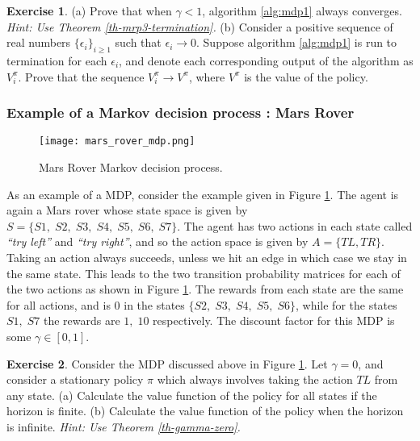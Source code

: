 \documentclass{article}
\theoremstyle{definition}
\newtheorem{exercise}{Exercise}[section]
\theoremstyle{remark}
\begin{document}
\begin{exercise}
(a) Prove that when $\gamma < 1$, algorithm \ref{alg:mdp1} always converges. \textit{Hint: Use Theorem \ref{th-mrp3-termination}.} (b) Consider a positive sequence of real numbers $\{\epsilon_i\}_{i \geq 1}$ such that $\epsilon_i \rightarrow 0$. Suppose algorithm \ref{alg:mdp1} is run to termination for each $\epsilon_i$, and denote each corresponding output of the algorithm as $V^{\pi}_{i}$. Prove that the sequence $V^{\pi}_{i} \rightarrow V^{\pi}$, where $V^{\pi}$ is the value of the policy.
\label{ex-mdp-valuefunc-alg-iterative-proof}
\end{exercise}

\subsubsection{Example of a Markov decision process : Mars Rover}
\label{MDP-example-subsubsection}
\begin{figure}[h]
    \centering
    \texttt{[image: mars\_rover\_mdp.png]}
    \caption{Mars Rover Markov decision process.}
    \label{fig:MDP}
\end{figure}
As an example of a MDP, consider the example given in Figure \ref{fig:MDP}. The agent is again a Mars rover whose state space is given by $S = \{S1,\; S2,\; S3,\; S4,\; S5,\; S6,\; S7\}$. The agent has two actions in each state called \textit{``try left''} and \textit{``try right''}, and so the action space is given by $A = \{TL, TR\}$. Taking an action always succeeds, unless we hit an edge in which case we stay in the same state. This leads to the two transition probability matrices for each of the two actions as shown in Figure \ref{fig:MDP}. The rewards from each state are the same for all actions, and is $0$ in the states $\{S2,\;S3,\;S4,\;S5,\;S6\}$, while for the states $S1,\;S7$ the rewards are $1,\;10$ respectively. The discount factor for this MDP is some $\gamma \in [0,1]$.

\begin{exercise}
Consider the MDP discussed above in Figure \ref{fig:MDP}. Let $\gamma = 0$, and consider a stationary policy $\pi$ which always involves taking the action $TL$ from any state. (a) Calculate the value function of the policy for all states if the horizon is finite. (b) Calculate the value function of the policy when the horizon is infinite. \textit{Hint: Use Theorem \ref{th-gamma-zero}.}
\label{ex-MDP-example}
\end{exercise}
\end{document}

